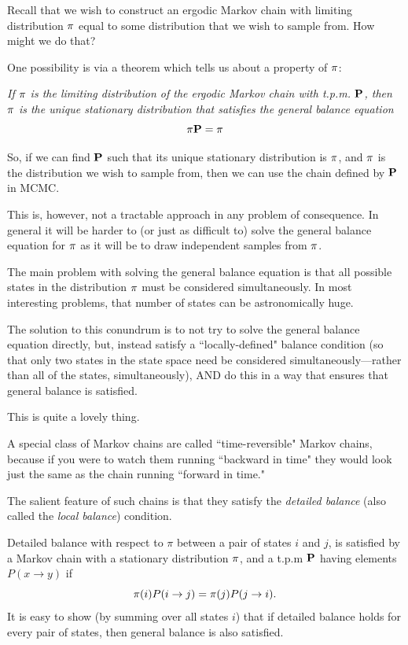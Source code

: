 Recall that we wish to construct an ergodic Markov chain with limiting distribution ${\pi}$ equal to some distribution that we wish to sample from.  How might we do that?

One possibility is via a theorem which tells us about a property of ${\pi}$:

{\sl If ${\pi}$ is the limiting distribution of the ergodic Markov chain with t.p.m. $\mathbf{P}$, then ${\pi}$ is the unique stationary distribution that satisfies the general balance equation}
\[
	{\pi}\mathbf{P} = {\pi}
\]

So, if we can find $\mathbf{P}$ such that its unique stationary distribution is ${\pi}$, and ${\pi}$ is the distribution we wish to sample from, then we can use the chain defined by $\mathbf{P}$ in MCMC.

This is, however, not a tractable approach in any problem of consequence.  In general it will be harder to (or just as difficult to) solve the general balance equation for ${\pi}$ as it will be to draw independent samples from ${\pi}$.

The main problem with solving the general balance equation is that all possible states in the distribution ${\pi}$ must be considered simultaneously.  In most interesting problems, that number of states can be astronomically huge.  

The solution to this conundrum is to not try to solve the general balance equation directly, but, instead satisfy a ``locally-defined" balance condition (so that only two states in the state space need be considered simultaneously---rather than all of the states, simultaneously), AND do this in a way that ensures that general balance is satisfied.

This is quite a lovely thing.   

A special class of Markov chains are called ``time-reversible" Markov chains, because if you were to watch them running ``backward in time" they would look just the same as the chain running ``forward in time."  

The salient feature of such chains is that they satisfy the {\em detailed balance} (also called the {\em local balance}) condition.

Detailed balance with respect to $\pi$ between a pair of states $i$ and $j$, is satisfied  by a Markov chain with a stationary distribution ${\pi}$, and a t.p.m $\mathbf{P}$ having elements $P(x\rightarrow y)$ if  
\[
	{\pi}(i)P(i\rightarrow j) = {\pi}(j)P(j\rightarrow i).
\]
It is easy to show (by summing over all states $i$) that if detailed balance holds for every pair of states, then general balance is also satisfied.

